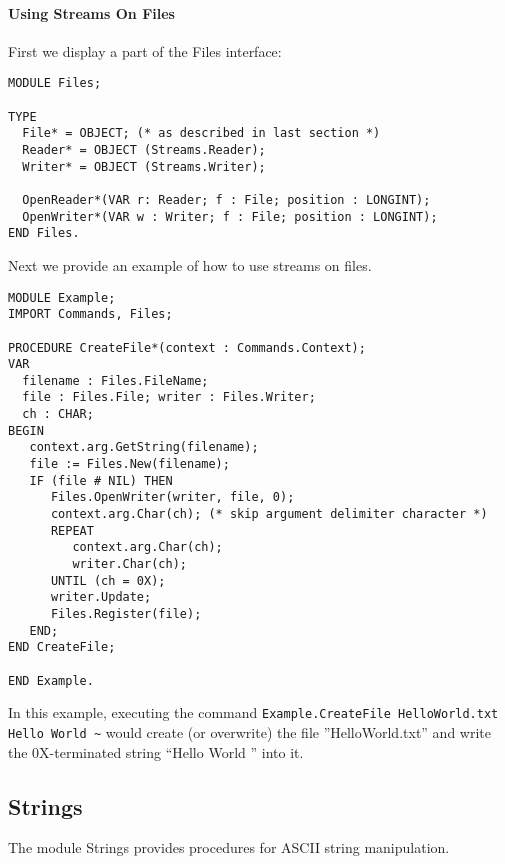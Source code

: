 \documentclass[a4paper,11pt]{article}
\begin{document}
\paragraph{Using Streams On Files}

First we display a part of the Files interface:
\begin{lstlisting}[language=Oberon,frame=none,caption={Using Streams On Files}]
MODULE Files;

TYPE
  File* = OBJECT; (* as described in last section *)
  Reader* = OBJECT (Streams.Reader);
  Writer* = OBJECT (Streams.Writer);

  OpenReader*(VAR r: Reader; f : File; position : LONGINT);
  OpenWriter*(VAR w : Writer; f : File; position : LONGINT);
END Files.
\end{lstlisting}

Next we provide an example of how to use streams on files.
\begin{lstlisting}[language=Oberon,frame=none,caption={Example: Create A New File}]
MODULE Example;
IMPORT Commands, Files;

PROCEDURE CreateFile*(context : Commands.Context);
VAR
  filename : Files.FileName;
  file : Files.File; writer : Files.Writer;
  ch : CHAR;
BEGIN
   context.arg.GetString(filename);
   file := Files.New(filename);
   IF (file # NIL) THEN
      Files.OpenWriter(writer, file, 0);
      context.arg.Char(ch); (* skip argument delimiter character *)
      REPEAT
         context.arg.Char(ch);
         writer.Char(ch);
      UNTIL (ch = 0X);
      writer.Update;
      Files.Register(file);
   END;
END CreateFile;

END Example.
\end{lstlisting}

In this example, executing the command \verb+Example.CreateFile HelloWorld.txt Hello World ~+ would create (or overwrite) the file ''HelloWorld.txt'' and write the 0X-terminated string ``Hello World '' into it.

\subsection{Strings}
The module Strings provides procedures for ASCII string manipulation.
\end{document}
